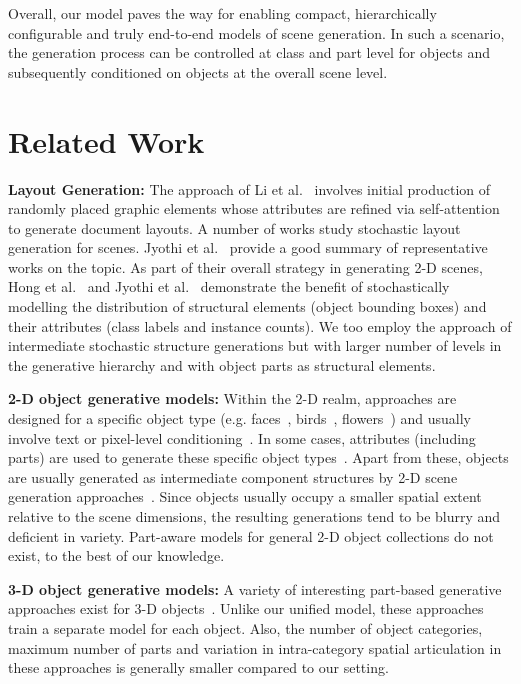 \documentclass[runningheads]{llncs}
\begin{document}
 Overall, our model paves the way for enabling compact, hierarchically configurable and truly end-to-end models of scene generation. In such a scenario, the generation process can be controlled at class and part level for objects and subsequently conditioned on objects at the overall scene level.

\section{Related Work}

\noindent \textbf{Layout Generation:} The approach of Li et al.~\cite{li2019layoutgan} involves initial production of randomly placed graphic elements whose attributes are refined via self-attention to generate document layouts. A number of works study stochastic layout generation for scenes. Jyothi et al.~\cite{Jyothi2019ICCV} provide a good summary of representative works on the topic. As part of their overall strategy in generating 2-D scenes, Hong et al.~\cite{hong2018inferring} and Jyothi et al.~\cite{Jyothi2019ICCV} demonstrate the benefit of stochastically modelling the distribution of structural elements (object bounding boxes) and their attributes (class labels and instance counts). We too employ the approach of intermediate stochastic structure generations but with larger number of levels in the generative hierarchy and with object parts as structural elements.

\noindent \textbf{2-D object generative models:} Within the 2-D realm, approaches are designed for a specific object type (e.g. faces~\cite{bessinger2019generative}, birds~\cite{yin2019semantics,zhang2018stackgan++}, flowers~\cite{park2018mc}) and usually involve text or pixel-level conditioning~\cite{isola2017image}. In some cases, attributes (including parts) are used to generate these specific object types~\cite{he2019attgan,yan2016attribute2image}.  Apart from these, objects are usually generated as intermediate component structures by 2-D scene generation approaches~\cite{hong2018inferring,park2019SPADE,Jyothi2019ICCV}. Since objects usually occupy a smaller spatial extent relative to the scene dimensions, the resulting generations tend to be blurry and deficient in variety. Part-aware models for general 2-D object collections do not exist, to the best of our knowledge.

\noindent \textbf{3-D object generative models:} A variety of interesting part-based generative approaches exist for 3-D objects~\cite{SAGnet19,Mo2019CVPR,mo2019structurenet,li2017grass,nash2017shape}. Unlike our unified model, these approaches train a separate model for each object. Also, the number of object categories, maximum number of parts and variation in intra-category spatial articulation in these approaches is generally smaller compared to our setting.
\end{document}
